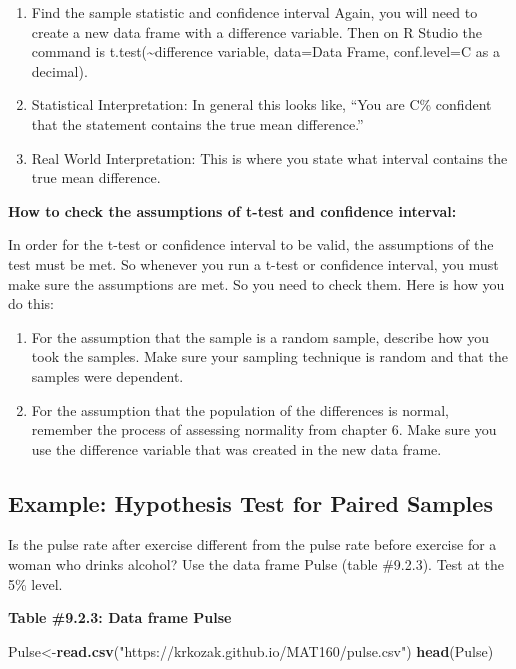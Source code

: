\documentclass[]{book}
\newenvironment{Shaded}{\begin{snugshade}}{\end{snugshade}}
\newcommand{\KeywordTok}[1]{\textcolor[rgb]{0.13,0.29,0.53}{\textbf{#1}}}
\newcommand{\NormalTok}[1]{#1}
\newcommand{\StringTok}[1]{\textcolor[rgb]{0.31,0.60,0.02}{#1}}
\begin{document}
\begin{enumerate}
\def\labelenumi{\arabic{enumi}.}
\item
  Find the sample statistic and confidence interval
  Again, you will need to create a new data frame with a difference variable. Then on R Studio the command is t.test(\textasciitilde{}difference variable, data=Data Frame, conf.level=C as a decimal).
\item
  Statistical Interpretation: In general this looks like, ``You are C\% confident that the statement contains the true mean difference.''
\item
  Real World Interpretation: This is where you state what interval contains the true mean difference.
\end{enumerate}

\textbf{How to check the assumptions of t-test and confidence interval:}

In order for the t-test or confidence interval to be valid, the assumptions of the test must be met. So whenever you run a t-test or confidence interval, you must make sure the assumptions are met. So you need to check them. Here is how you do this:

\begin{enumerate}
\def\labelenumi{\arabic{enumi}.}
\item
  For the assumption that the sample is a random sample, describe how you took the samples. Make sure your sampling technique is random and that the samples were dependent.
\item
  For the assumption that the population of the differences is normal, remember the process of assessing normality from chapter 6. Make sure you use the difference variable that was created in the new data frame.
\end{enumerate}

\hypertarget{example-hypothesis-test-for-paired-samples}{%
\subsection{Example: Hypothesis Test for Paired Samples}\label{example-hypothesis-test-for-paired-samples}}

Is the pulse rate after exercise different from the pulse rate before exercise for a woman who drinks alcohol? Use the data frame Pulse (table \#9.2.3). Test at the 5\% level.

\textbf{Table \#9.2.3: Data frame Pulse}

\begin{Shaded}
\begin{Highlighting}[]
\NormalTok{Pulse<-}\KeywordTok{read.csv}\NormalTok{(}\StringTok{"https://krkozak.github.io/MAT160/pulse.csv"}\NormalTok{)}
\KeywordTok{head}\NormalTok{(Pulse)}
\end{Highlighting}
\end{Shaded}
\end{document}
